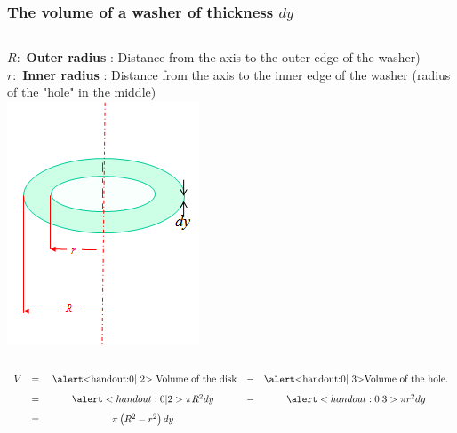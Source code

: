 


\begin{frame}\frametitle{The volume of a washer of thickness $dy$}

\begin{columns}[c]

$ R: $ \textbf{Outer radius} : Distance from the axis to the outer edge of the washer)\\[4mm]

$ r: $ \textbf{Inner radius} : Distance from the axis to the inner edge of the washer (radius of the "hole" in the middle)\\

{\includegraphics[height=.5\textheight]{volumes/pictures/W1}}
\end{columns}
\begin{center}

\[
\begin{array}{rcccc}
V  & =& \text{ \alert<handout:0| 2> {Volume of the disk}}&  -& \text{\alert<handout:0| 3>{Volume of the hole}.}\\[3mm]
   & =& \alert<handout:0| 2>{\pi R^2 dy} &-& \alert<handout:0| 3>{\pi r^2 dy}\\[3mm]
   & = &\pi\left(R^2-r^2\right)dy&&
\end{array}
\]

\end{center}
\end{frame}


